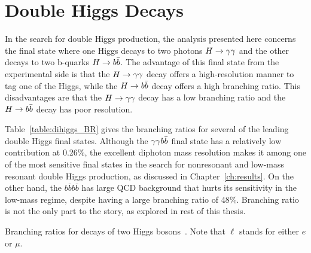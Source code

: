

\section{Double Higgs Decays}

In the search for double Higgs production, the analysis presented here concerns the final state
where one Higgs decays to two photons $H\to\gamma\gamma$ and the other decays to two b-quarks $H\to b\bar{b}$.
The advantage of this final state from the experimental side is that the $H\to\gamma\gamma$ decay
offers a high-resolution manner to tag one of the Higgs, while the $H\to b\bar{b}$ decay offers a high branching
ratio. This disadvantages are that the $H\to\gamma\gamma$ decay has a low branching ratio and the
$H\to b\bar{b}$ decay has poor resolution.

Table~\ref{table:dihiggs_BR} gives the branching ratios for several of the leading double Higgs
final states. Although the $\gamma\gamma b\bar{b}$ final state has a relatively low contribution at 0.26\%,
the excellent
diphoton mass resolution makes it among one of the most sensitive final states in the search for
nonresonant and low-mass resonant double Higgs production, as discussed in Chapter~\ref{ch:results}.
On the other hand, the $b\bar{b} b\bar{b}$ has large QCD background that hurts its sensitivity
in the low-mass regime, despite having a large branching ratio of 48\%. Branching ratio is not the
only part to the story, as explored in rest of this thesis.

\begin{table}[ht]
  \centering
  \renewcommand{\arraystretch}{1.4}
  \caption{Branching ratios for decays of two Higgs bosons~\cite{LHC:SMHiggsBR}.
Note that $\ell$ stands for either $e$ or $\mu$.}
  
  \label{table:dihiggs_BR}
\end{table}

